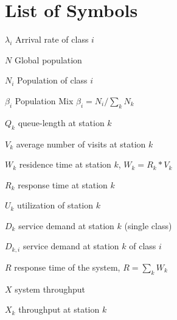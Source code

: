 \chapter{List of Symbols}
\label{cha:symbols}
\begin{description*}
\item[$\lambda_i$] Arrival rate of class $i$
\item[$N$] Global population
\item[$N_i$] Population of class $i$
\item[$\beta_i$] Population Mix $\beta_i = N_i / \sum_k
N_k$
\item[$Q_k$] queue-length at station $k$
\item[$V_k$] average number of visits at station $k$
\item[$W_k$] residence time at station $k$, $W_k = R_k * V_k$
\item[$R_k$] response time at station $k$
\item[$U_k$] utilization of station $k$
\item[$D_{k}$] service demand at station $k$ (single class)
\item[$D_{k,i}$] service demand at station $k$ of class $i$
\item[$R$] response time of the system, $R= \sum_k W_k$
\item[$X$] system throughput
\item[$X_k$] throughput at station $k$
\end{description*}
